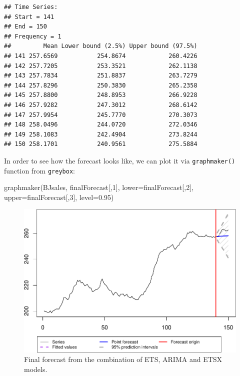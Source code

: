 \documentclass[
]{book}
\newenvironment{Shaded}{\begin{snugshade}}{\end{snugshade}}
\newcommand{\AttributeTok}[1]{\textcolor[rgb]{0.77,0.63,0.00}{#1}}
\newcommand{\DecValTok}[1]{\textcolor[rgb]{0.00,0.00,0.81}{#1}}
\newcommand{\FloatTok}[1]{\textcolor[rgb]{0.00,0.00,0.81}{#1}}
\newcommand{\FunctionTok}[1]{\textcolor[rgb]{0.00,0.00,0.00}{#1}}
\newcommand{\NormalTok}[1]{#1}
\theoremstyle{definition}
\theoremstyle{definition}
\theoremstyle{definition}
\theoremstyle{definition}
\theoremstyle{remark}
\begin{document}
\begin{verbatim}
## Time Series:
## Start = 141 
## End = 150 
## Frequency = 1 
##         Mean Lower bound (2.5%) Upper bound (97.5%)
## 141 257.6569           254.8674            260.4226
## 142 257.7205           253.3521            262.1138
## 143 257.7834           251.8837            263.7279
## 144 257.8296           250.3830            265.2358
## 145 257.8800           248.8953            266.9228
## 146 257.9282           247.3012            268.6142
## 147 257.9954           245.7770            270.3073
## 148 258.0496           244.0720            272.0346
## 149 258.1083           242.4904            273.8244
## 150 258.1701           240.9561            275.5884
\end{verbatim}

In order to see how the forecast looks like, we can plot it via \texttt{graphmaker()} function from \texttt{greybox}:

\begin{Shaded}
\begin{Highlighting}[]
\FunctionTok{graphmaker}\NormalTok{(BJsales, finalForecast[,}\DecValTok{1}\NormalTok{],}
           \AttributeTok{lower=}\NormalTok{finalForecast[,}\DecValTok{2}\NormalTok{], }\AttributeTok{upper=}\NormalTok{finalForecast[,}\DecValTok{3}\NormalTok{],}
           \AttributeTok{level=}\FloatTok{0.95}\NormalTok{)}
\end{Highlighting}
\end{Shaded}

\begin{figure}
\centering
\includegraphics{Svetunkov--2022----ADAM_files/figure-latex/adamCombinedfinalForecast-1.pdf}
\caption{\label{fig:adamCombinedfinalForecast}Final forecast from the combination of ETS, ARIMA and ETSX models.}
\end{figure}
\end{document}
